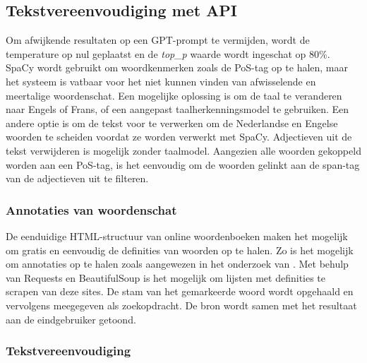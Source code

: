 
\subsection{Tekstvereenvoudiging met API}

Om afwijkende resultaten op een GPT-prompt te vermijden, wordt de temperature op nul geplaatst en de \textit{top\_p} waarde wordt ingeschat op 80\%. SpaCy wordt gebruikt om woordkenmerken zoals de PoS-tag op te halen, maar het systeem is vatbaar voor het niet kunnen vinden van afwisselende en meertalige woordenschat. Een mogelijke oplossing is om de taal te veranderen naar Engels of Frans, of een aangepast taalherkenningsmodel te gebruiken. Een andere optie is om de tekst voor te verwerken om de Nederlandse en Engelse woorden te scheiden voordat ze worden verwerkt met SpaCy. Adjectieven uit de tekst verwijderen is mogelijk zonder taalmodel. Aangezien alle woorden gekoppeld worden aan een PoS-tag, is het eenvoudig om de woorden gelinkt aan de span-tag van de adjectieven uit te filteren.

\subsubsection{Annotaties van woordenschat}

De eenduidige HTML-structuur van online woordenboeken maken het mogelijk om gratis en eenvoudig de definities van woorden op te halen. Zo is het mogelijk om annotaties op te halen zoals aangewezen in het onderzoek van \textcite{Bulte2018}. Met behulp van Requests en BeautifulSoup is het mogelijk om lijsten met definities te scrapen van deze sites. De stam van het gemarkeerde woord wordt opgehaald en vervolgens meegegeven als zoekopdracht. De bron wordt samen met het resultaat aan de eindgebruiker getoond. 

\subsubsection{Tekstvereenvoudiging}

